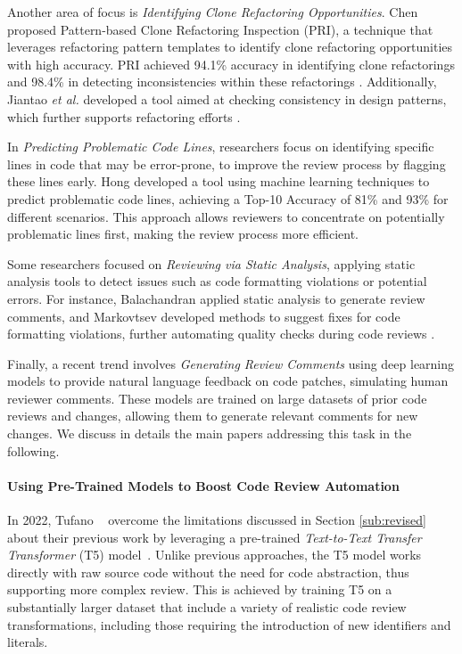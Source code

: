Another area of focus is \textit{Identifying Clone Refactoring Opportunities}.
Chen \etal proposed Pattern-based Clone Refactoring Inspection (PRI), a
technique that leverages refactoring pattern templates to identify clone
refactoring opportunities with high accuracy. PRI achieved 94.1\% accuracy in
identifying clone refactorings and 98.4\% in detecting inconsistencies within
these refactorings \cite{chen:compsac2017}. Additionally, Jiantao \textit{et
    al.} developed a tool aimed at checking consistency in design patterns, which
further supports refactoring efforts \cite{he:sere2013}.

In \textit{Predicting Problematic Code Lines}, researchers focus on identifying
specific lines in code that may be error-prone, to improve the review process
by flagging these lines early. Hong \etal developed a tool using machine
learning techniques to predict problematic code lines, achieving a Top-10
Accuracy of 81\% and 93\% for different scenarios. This approach allows
reviewers to concentrate on potentially problematic lines first, making the
review process more efficient.

Some researchers focused on \textit{Reviewing via Static Analysis}, applying
static analysis tools to detect issues such as code formatting violations or
potential errors. For instance, Balachandran \etal applied static analysis to
generate review comments, and Markovtsev \etal developed methods to suggest
fixes for code formatting violations, further automating quality checks during
code reviews \cite{balachandran:icse2013,markovtsev:msr2019}.

Finally, a recent trend involves \textit{Generating Review Comments} using deep
learning models to provide natural language feedback on code patches,
simulating human reviewer comments. These models are trained on large datasets
of prior code reviews and changes, allowing them to generate relevant comments
for new changes. We discuss in details the main papers addressing this task in
the following.

\paragraph{Using Pre-Trained Models to Boost Code Review Automation}

In 2022, Tufano \etal~\cite{tufano:icse2022} overcome the limitations discussed
in Section \ref{sub:revised} about their previous work \cite{tufano:icse2021}
by leveraging a pre-trained \textit{Text-to-Text Transfer Transformer} (T5)
model~\cite{raffel:jmlr2019}. Unlike previous approaches, the T5 model works
directly with raw source code without the need for code abstraction, thus
supporting more complex review. This is achieved by training T5 on a
substantially larger dataset that include a variety of realistic code review
transformations, including those requiring the introduction of new identifiers
and literals.

